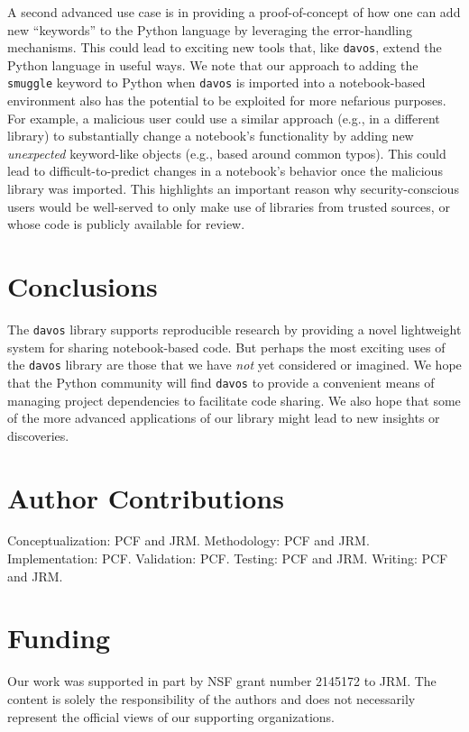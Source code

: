 \documentclass[preprint,12pt, a4paper]{elsarticle}
\begin{document}
A second advanced use case is in providing a proof-of-concept of how
one can add new ``keywords'' to the Python language by leveraging the
error-handling mechanisms.  This could lead to exciting new tools
that, like \texttt{davos}, extend the Python language in useful ways.
We note that our approach to adding the \texttt{smuggle} keyword to
Python when \texttt{davos} is imported into a notebook-based
environment also has the potential to be exploited for more nefarious
purposes.  For example, a malicious user could use a similar approach
(e.g., in a different library) to substantially change a notebook's
functionality by adding new \textit{unexpected} keyword-like objects
(e.g., based around common typos).  This could lead to
difficult-to-predict changes in a notebook's behavior once the
malicious library was imported.  This highlights an important reason
why security-conscious users would be well-served to only make use of
libraries from trusted sources, or whose code is publicly available
for review.

\section{Conclusions}

The \texttt{davos} library supports reproducible research by providing
a novel lightweight system for sharing notebook-based code.  But
perhaps the most exciting uses of the \texttt{davos} library are those
that we have \textit{not} yet considered or imagined.  We hope that
the Python community will find \texttt{davos} to provide a convenient
means of managing project dependencies to facilitate code sharing.  We
also hope that some of the more advanced applications of our library
might lead to new insights or discoveries.


\section*{Author Contributions}
Conceptualization: PCF and JRM.  Methodology: PCF and JRM.
Implementation: PCF.  Validation: PCF.  Testing: PCF and JRM.
Writing: PCF and JRM.

\section*{Funding}
Our work was supported in part by NSF grant number 2145172 to JRM.
The content is solely the responsibility of the authors and does not necessarily represent the official views of our supporting organizations.
\end{document}
